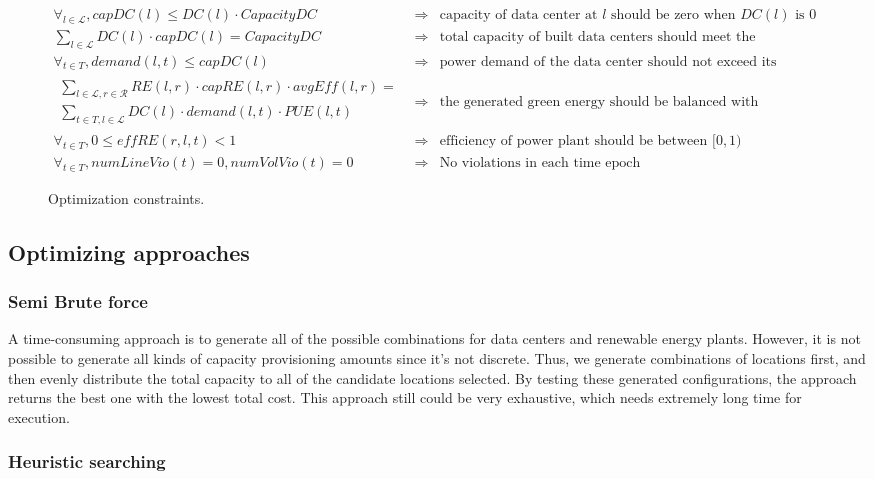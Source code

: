 \begin{figure*} [ht]
\begin{small}
\centering
\begin{eqnarray}
\forall_{l \in \mathcal{L}}, capDC(l) \leq DC(l) \cdot CapacityDC
&\Rightarrow& \text{capacity of data center at $l$ should be zero when $DC(l)$ is 0} \\
\sum_{l\in \mathcal{L}}{DC(l)\cdot capDC(l)} = CapacityDC
&\Rightarrow& \text{total capacity of built data centers should meet the requirement} \\
\forall_{t \in T}, demand(l,t) \leq capDC(l)
&\Rightarrow& \text{power demand of the data center should not exceed its capacity} \\
\begin{split}
\sum_{l \in \mathcal{L},r \in \mathcal{R}}{ RE(l,r) \cdot capRE(l,r) \cdot avg\textit{Eff}(l,r) } = \\
\sum_{t \in T, l\in \mathcal{L}}{DC(l) \cdot demand(l,t)\cdot PUE(l,t)}
\end{split}
&\Rightarrow &\text{the generated green energy should be balanced with consumption} \\
\forall_{t \in T}, 0 \leq \textit{eff}RE(r,l,t) < 1
&\Rightarrow&  \text{efficiency of power plant should be between $[0,1)$} \\
\forall_{t \in T}, numLineVio(t)=0, numVolVio(t)=0
&\Rightarrow& \text{No violations in each time epoch}
\end{eqnarray}
\end{small}
\caption{Optimization constraints.}
\label{fig:constraints}
\end{figure*}

\subsection{Optimizing approaches}
\subsubsection{Semi Brute force}
A time-consuming approach is to generate all of the possible combinations for data centers and renewable energy plants. However, it is not possible to generate all kinds of capacity provisioning amounts since it's not discrete. Thus, we generate combinations of locations first, and then evenly distribute the total capacity to all of the candidate locations selected. By testing these generated configurations, the approach returns the best one with the lowest total cost. This approach still could be very exhaustive, which needs extremely long time for execution.

\subsubsection{Heuristic searching}



